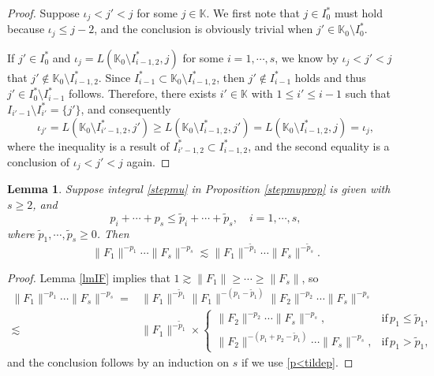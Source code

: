\documentclass[11pt,reqno]{amsart}
\newtheorem{lemma}[theorem]{Lemma}
\numberwithin{equation}{section}
\theoremstyle{definition}
\begin{document}
\begin{proof}
	Suppose $\iota_j<j'<j$ for some $j\in\mathbb{K}$. We first note that $j\in I_0^*$ must hold because $\iota_j\leq j-2$, and the conclusion is obviously trivial when $j'\in\mathbb{K}_0\setminus I_0^*$.
	
	If $j'\in I_0^*$ and $\iota_j=L(\mathbb{K}_0\setminus I_{i-1,2}^*,j)$ for some $i=1,\cdots,s$, we know by $\iota_j<j'<j$ that $j'\notin\mathbb{K}_0\setminus I_{i-1,2}^*$. Since $I_{i-1}^*\subset\mathbb{K}_0\setminus I_{i-1,2}^*$, then $j'\notin I_{i-1}^*$ holds and thus $j'\in I_0^*\setminus I_{i-1}^*$ follows. Therefore, there exists $i'\in\mathbb{K}$ with $1\leq i'\leq i-1$ such that $I_{i'-1}\setminus I_{i'}^*=\{j'\}$, and consequently
	\begin{equation*}
		\iota_{j'}=L(\mathbb{K}_0\setminus I_{i'-1,2}^*,j')\geq L(\mathbb{K}_0\setminus I_{i-1,2}^*,j')=L(\mathbb{K}_0\setminus I_{i-1,2}^*,j)=\iota_j,
	\end{equation*}
	where the inequality is a result of $I_{i'-1,2}^*\subset I_{i-1,2}^*$, and the second equality is a conclusion of $\iota_j<j'<j$ again.
\end{proof}



\begin{lemma}\label{lmFp}
	Suppose integral \eqref{stepmu} in Proposition \ref{stepmuprop} is given with $s\geq2$, and
	\begin{equation}\label{p<tildep}
		p_i+\cdots+p_s\leq \tilde{p}_i+\cdots+\tilde{p}_s,\quad i=1,\cdots,s,
	\end{equation}
	where $\tilde{p}_1,\cdots,\tilde{p}_s\geq0$. Then
	\begin{equation*}
		\|F_1\|^{-p_1}\cdots\|F_s\|^{-p_s}\lesssim\|F_1\|^{-\tilde{p}_1}\cdots\|F_s\|^{-\tilde{p}_s}.
	\end{equation*}
\end{lemma}

\begin{proof}
	Lemma \ref{lmIF} implies that $1\gtrsim\|F_1\|\geq\cdots\geq\|F_s\|$, so
	\begin{equation*}
		\begin{split}
			\|F_1\|^{-p_1}\cdots\|F_s\|^{-p_s}=&\|F_1\|^{-\tilde{p}_1}\|F_1\|^{-(p_1-\tilde{p}_1)}\|F_2\|^{-p_2}\cdots\|F_s\|^{-p_s}\\
			\lesssim&\|F_1\|^{-\tilde{p}_1}\times\begin{cases}
				\|F_2\|^{-p_2}\cdots\|F_s\|^{-p_s},\quad&\text{if}\,p_1\leq\tilde{p}_1,\\
				\|F_2\|^{-(p_1+p_2-\tilde{p}_1)}\cdots\|F_s\|^{-p_s},&\text{if}\,p_1>\tilde{p}_1,
			\end{cases}
		\end{split}
	\end{equation*}
	and the conclusion follows by an induction on $s$ if we use \eqref{p<tildep}.
\end{proof}
\end{document}
